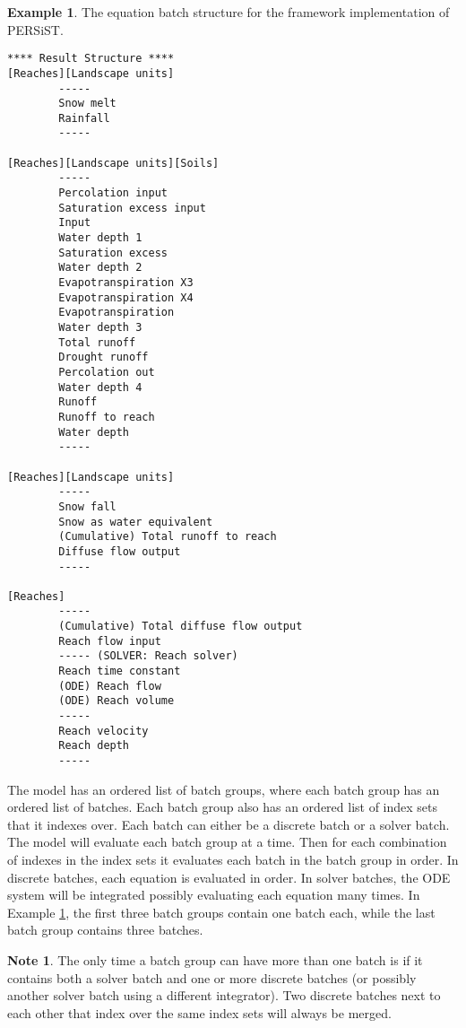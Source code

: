 \documentclass[11pt]{article}
\theoremstyle{definition}
\newtheorem{mynote}{Note}
\newenvironment{note}%
  {\begin{lrbox}{\notebox}%
   \begin{minipage}{\dimexpr\linewidth-2\fboxsep}
   \begin{mynote}}%
  {\end{mynote}%
   \end{minipage}%
   \end{lrbox}%
   \begin{trivlist}
     \item[]\colorbox{silver}{\usebox\notebox}
   \end{trivlist}}
\newtheorem{myexample}{Example}
\newenvironment{example}%
  {\begin{lrbox}{\examplebox}%
   \begin{minipage}{\dimexpr\linewidth-2\fboxsep}
   \begin{myexample}}%
  {\end{myexample}%
   \end{minipage}%
   \end{lrbox}%
   \begin{trivlist}
     \item[]\colorbox{silver}{\usebox\examplebox}
   \end{trivlist}}
\begin{document}
\begin{example}\label{ex:persiststructure}
The equation batch structure for the framework implementation of PERSiST.
\begin{lstlisting}[style=textstyle]
**** Result Structure ****
[Reaches][Landscape units]
        -----
        Snow melt
        Rainfall
        -----

[Reaches][Landscape units][Soils]
        -----
        Percolation input
        Saturation excess input
        Input
        Water depth 1
        Saturation excess
        Water depth 2
        Evapotranspiration X3
        Evapotranspiration X4
        Evapotranspiration
        Water depth 3
        Total runoff
        Drought runoff
        Percolation out
        Water depth 4
        Runoff
        Runoff to reach
        Water depth
        -----

[Reaches][Landscape units]
        -----
        Snow fall
        Snow as water equivalent
        (Cumulative) Total runoff to reach
        Diffuse flow output
        -----

[Reaches]
        -----
        (Cumulative) Total diffuse flow output
        Reach flow input
        ----- (SOLVER: Reach solver)
        Reach time constant
        (ODE) Reach flow
        (ODE) Reach volume
        -----
        Reach velocity
        Reach depth
        -----
\end{lstlisting}
\end{example}

The model has an ordered list of batch groups, where each batch group has an ordered list of batches. Each batch group also has an ordered list of index sets that it indexes over. Each batch can either be a discrete batch or a solver batch. The model will evaluate each batch group at a time. Then for each combination of indexes in the index sets it evaluates each batch in the batch group in order. In discrete batches, each equation is evaluated in order. In solver batches, the ODE system will be integrated possibly evaluating each equation many times. In Example \ref{ex:persiststructure}, the first three batch groups contain one batch each, while the last batch group contains three batches. 

\begin{note}
The only time a batch group can have more than one batch is if it contains both a solver batch and one or more discrete batches (or possibly another solver batch using a different integrator). Two discrete batches next to each other that index over the same index sets will always be merged.
\end{note}
\end{document}
